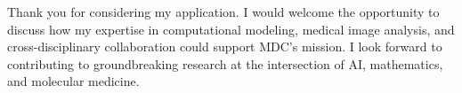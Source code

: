 \documentclass[11pt,a4paper, final]{moderncv}
\begin{document}
Thank you for considering my application. 
I would welcome the opportunity to discuss how my expertise in computational modeling, medical image analysis, and cross-disciplinary collaboration could support MDC's mission. 
I look forward to contributing to groundbreaking research at the intersection of AI, mathematics, and molecular medicine.

\makeletterclosing
\end{document}
